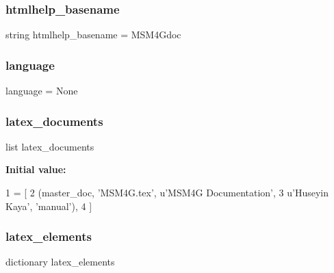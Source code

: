 \hypertarget{namespaceconf_a75a82d2191ce50cef1a4b6522da3c148}{}\label{namespaceconf_a75a82d2191ce50cef1a4b6522da3c148} 
\subsubsection{\texorpdfstring{htmlhelp\+\_\+basename}{htmlhelp\_basename}}
{\footnotesize\ttfamily string htmlhelp\+\_\+basename = \textquotesingle{}M\+S\+M4\+Gdoc\textquotesingle{}}

\hypertarget{namespaceconf_aa37aa8979934d47ac32fd96ecff32202}{}\label{namespaceconf_aa37aa8979934d47ac32fd96ecff32202} 
\subsubsection{\texorpdfstring{language}{language}}
{\footnotesize\ttfamily language = None}

\hypertarget{namespaceconf_a19ce49f2838fb86624dc2d34e023baca}{}\label{namespaceconf_a19ce49f2838fb86624dc2d34e023baca} 
\subsubsection{\texorpdfstring{latex\+\_\+documents}{latex\_documents}}
{\footnotesize\ttfamily list latex\+\_\+documents}

{\bfseries Initial value\+:}
\begin{DoxyCode}
1 =  [
2     (master\_doc, \textcolor{stringliteral}{'MSM4G.tex'}, \textcolor{stringliteral}{u'MSM4G Documentation'},
3      \textcolor{stringliteral}{u'Huseyin Kaya'}, \textcolor{stringliteral}{'manual'}),
4 ]
\end{DoxyCode}
\hypertarget{namespaceconf_a271e3f105e3929daf675adc46f5027e6}{}\label{namespaceconf_a271e3f105e3929daf675adc46f5027e6} 
\subsubsection{\texorpdfstring{latex\+\_\+elements}{latex\_elements}}
{\footnotesize\ttfamily dictionary latex\+\_\+elements}

